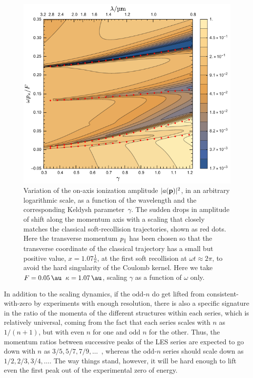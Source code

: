 
\begin{figure}[hbt]
  \centering
  \includegraphics[scale=1]{6-LES/Figures/figure6-2C.pdf}
  \caption[
  Scaling of the ARM spectrum for 
  ]{
  Variation of the on-axis ionization amplitude $|a(\vb{p})|^2$, in an arbitrary logarithmic scale, as a function of the wavelength and the corresponding Keldysh parameter~$\gamma$. The sudden drops in amplitude of  shift along the momentum axis with a scaling that closely matches the classical soft-recollision trajectories, shown as red dots. Here the transverse momentum ${p_{\parallel}}$ has been chosen so that the transverse coordinate of the classical trajectory has a small but positive value, $x = 1.07\tfrac{1}{\kappa}$, at the first soft recollision at $\omega t\approx 2\pi$, to avoid the hard singularity of the Coulomb kernel. 
  Here we take $F=\SI{\figuresixtwoCfield}{\au}$ $\kappa=\SI{\figuresixtwoCkappa}{\au}$, scaling $\gamma$ as a function of $\omega$ only.
  }
\label{f6-spectrum-scaling}
\end{figure}

In addition to the scaling dynamics, if the odd-$n$ do get lifted from consistent-with-zero by experiments with enough resolution, there is also a specific signature in the ratio of the momenta of the different structures within each series, which is relatively universal, coming from the fact that each series scales with $n$ as $1/(n+1)$, but with even $n$ for one and odd $n$ for the other. Thus, the momentum ratios between successive peaks of the LES series are expected to go down with $n$ as $3/5,5/7,7/9,\ldots$~\cite{Rost_PRL, Rost_JPhysB}, whereas the odd-$n$ series should scale down as $1/2,2/3,3/4,\ldots$. The way things stand, however, it will be hard enough to lift even the first peak out of the experimental zero of energy.





